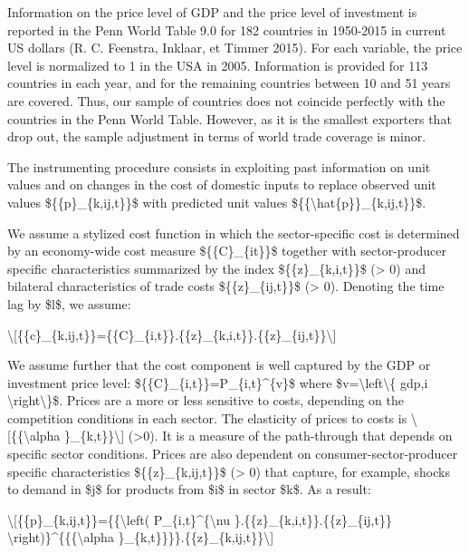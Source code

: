 \documentclass[12pt,twoside,a4paper,notitlepage]{article}
\begin{document}
Information on the price level of GDP and the price level of investment is reported in the Penn World Table 9.0 for 182 countries in 1950-2015 in current US dollars (R. C. Feenstra, Inklaar, et Timmer 2015). For each variable, the price level is normalized to 1 in the USA in 2005. Information is provided for 113 countries in each year, and for the remaining countries between 10 and 51 years are covered. Thus, our sample of countries does not coincide perfectly with the countries in the Penn World Table. However, as it is the smallest exporters that drop out, the sample adjustment in terms of world trade coverage is minor.

The instrumenting procedure consists in exploiting past information on unit values and on changes in the cost of domestic inputs to replace observed unit values \$\{\{p\}\_\{k,ij,t\}\}\$ with predicted unit values \$\{\{\textbackslash hat\{p\}\}\_\{k,ij,t\}\}\$.

We assume a stylized cost function in which the sector-specific cost is determined by an economy-wide cost measure \$\{\{C\}\_\{it\}\}\$ together with sector-producer specific characteristics summarized by the index \$\{\{z\}\_\{k,i,t\}\}\$ ({\textgreater} 0) and bilateral characteristics of trade costs \$\{\{z\}\_\{ij,t\}\}\$ ({\textgreater} 0). Denoting the time lag by \$l\$, we assume:

\textbackslash [\{\{c\}\_\{k,ij,t\}\}=\{\{C\}\_\{i,t\}\}.\{\{z\}\_\{k,i,t\}\}.\{\{z\}\_\{ij,t\}\}\textbackslash ] 

We assume further that the cost component is well captured by the GDP or investment price level: \$\{\{C\}\_\{i,t\}\}=P\_\{i,t\}\textasciicircum{}\{v\}\$ where \$v=\textbackslash left\textbackslash \{ gdp,i \textbackslash right\textbackslash \}\$. Prices are a more or less sensitive to costs, depending on the competition conditions in each sector. The elasticity of prices to costs is \textbackslash [\{\{\textbackslash alpha \}\_\{k,t\}\}\textbackslash ] ({\textgreater}0). It is a measure of the path-through that depends on specific sector conditions. Prices are also dependent on consumer-sector-producer specific characteristics \$\{\{z\}\_\{k,ij,t\}\}\$ ({\textgreater} 0) that capture, for example, shocks to demand in \$j\$ for products from \$i\$ in sector \$k\$. As a result:

\textbackslash [\{\{p\}\_\{k,ij,t\}\}=\{\{\textbackslash left( P\_\{i,t\}\textasciicircum{}\{\textbackslash nu \}.\{\{z\}\_\{k,i,t\}\}.\{\{z\}\_\{ij,t\}\} \textbackslash right)\}\textasciicircum{}\{\{\{\textbackslash alpha \}\_\{k,t\}\}\}\}.\{\{z\}\_\{k,ij,t\}\}\textbackslash ]
\end{document}
